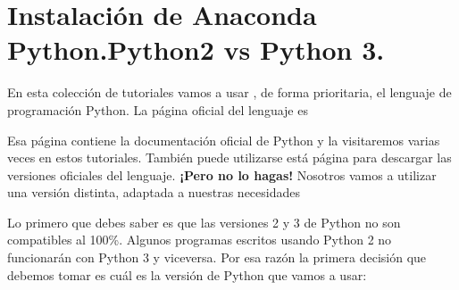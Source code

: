 \documentclass[10pt,a4paper]{article}\usepackage[]{graphicx}\usepackage[]{color}
\newcounter {cont01}
\begin{document}
\section{Instalación de Anaconda Python.Python2 vs Python 3.}
\label{tut02Py:sec:instalacionAnaconda}

En esta colección de tutoriales vamos a usar , de forma prioritaria, el lenguaje de programación Python. La página oficial del lenguaje es
\begin{center}
\end{center}
Esa página contiene la documentación oficial de Python y la visitaremos varias veces en estos tutoriales. También puede utilizarse está página para descargar las versiones oficiales del lenguaje. {\bf ¡Pero no lo hagas!} Nosotros vamos a utilizar una versión distinta, adaptada a nuestras necesidades

Lo primero que debes saber es que las versiones 2 y 3 de Python no son compatibles al 100\%. Algunos programas escritos usando Python 2 no funcionarán con Python 3 y viceversa. Por esa razón la primera decisión que debemos tomar es cuál es la versión de Python que vamos a usar:

    \begin{center}
    \end{center}
\end{document}

